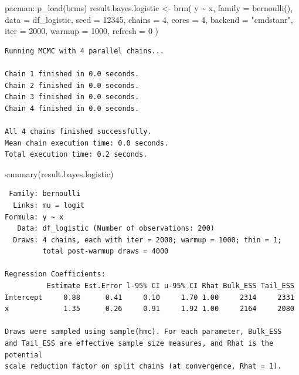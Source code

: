 \documentclass[
  a4paper,
]{ltjsbook}
\newenvironment{Shaded}{\begin{snugshade}}{\end{snugshade}}
\newcommand{\AttributeTok}[1]{\textcolor[rgb]{0.40,0.45,0.13}{#1}}
\newcommand{\DecValTok}[1]{\textcolor[rgb]{0.68,0.00,0.00}{#1}}
\newcommand{\FunctionTok}[1]{\textcolor[rgb]{0.28,0.35,0.67}{#1}}
\newcommand{\NormalTok}[1]{\textcolor[rgb]{0.00,0.23,0.31}{#1}}
\newcommand{\OtherTok}[1]{\textcolor[rgb]{0.00,0.23,0.31}{#1}}
\newcommand{\SpecialCharTok}[1]{\textcolor[rgb]{0.37,0.37,0.37}{#1}}
\newcommand{\StringTok}[1]{\textcolor[rgb]{0.13,0.47,0.30}{#1}}
\begin{document}
\begin{Shaded}
\begin{Highlighting}[]
\NormalTok{pacman}\SpecialCharTok{::}\FunctionTok{p\_load}\NormalTok{(brms)}
\NormalTok{result.bayes.logistic }\OtherTok{\textless{}{-}} \FunctionTok{brm}\NormalTok{(}
\NormalTok{    y }\SpecialCharTok{\textasciitilde{}}\NormalTok{ x,}
    \AttributeTok{family =} \FunctionTok{bernoulli}\NormalTok{(),}
    \AttributeTok{data =}\NormalTok{ df\_logistic,}
    \AttributeTok{seed =} \DecValTok{12345}\NormalTok{,}
    \AttributeTok{chains =} \DecValTok{4}\NormalTok{, }\AttributeTok{cores =} \DecValTok{4}\NormalTok{, }\AttributeTok{backend =} \StringTok{"cmdstanr"}\NormalTok{,}
    \AttributeTok{iter =} \DecValTok{2000}\NormalTok{, }\AttributeTok{warmup =} \DecValTok{1000}\NormalTok{,}
    \AttributeTok{refresh =} \DecValTok{0}
\NormalTok{)}
\end{Highlighting}
\end{Shaded}

\begin{verbatim}
Running MCMC with 4 parallel chains...

Chain 1 finished in 0.0 seconds.
Chain 2 finished in 0.0 seconds.
Chain 3 finished in 0.0 seconds.
Chain 4 finished in 0.0 seconds.

All 4 chains finished successfully.
Mean chain execution time: 0.0 seconds.
Total execution time: 0.2 seconds.
\end{verbatim}

\begin{Shaded}
\begin{Highlighting}[]
\FunctionTok{summary}\NormalTok{(result.bayes.logistic)}
\end{Highlighting}
\end{Shaded}

\begin{verbatim}
 Family: bernoulli 
  Links: mu = logit 
Formula: y ~ x 
   Data: df_logistic (Number of observations: 200) 
  Draws: 4 chains, each with iter = 2000; warmup = 1000; thin = 1;
         total post-warmup draws = 4000

Regression Coefficients:
          Estimate Est.Error l-95% CI u-95% CI Rhat Bulk_ESS Tail_ESS
Intercept     0.88      0.41     0.10     1.70 1.00     2314     2331
x             1.35      0.26     0.91     1.92 1.00     2164     2080

Draws were sampled using sample(hmc). For each parameter, Bulk_ESS
and Tail_ESS are effective sample size measures, and Rhat is the potential
scale reduction factor on split chains (at convergence, Rhat = 1).
\end{verbatim}
\end{document}
